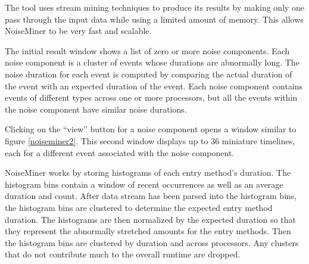 The tool uses stream mining techniques to produce its results by making only one pass through the input data while using a limited amount of memory. This allows NoiseMiner to be very fast and scalable. 


The initial result window shows a list of zero or more noise
components. Each noise component is a cluster of events whose
durations are abnormally long. The noise duration for each event is
computed by comparing the actual duration of the event with an
expected duration of the event. Each noise component contains events
of different types across one or more processors, but all the events
within the noise component have similar noise durations. 

Clicking on the ``view'' button for a noise component opens a window similar to
figure \ref{noiseminer2}. This second window displays up to 36
miniature timelines, each for a different event associated with the
noise component.



NoiseMiner works by storing histograms of each entry method's
duration. The histogram bins contain a window of recent occurrences as
well as an average duration and count. After data stream has been
parsed into the histogram bins, the histogram bins are clustered to
determine the expected entry method duration. The histograms are
then normalized by the expected duration so that they represent the
abnormally stretched amounts for the entry methods. Then the histogram
bins are clustered by duration and across processors. Any clusters
that do not contribute much to the overall runtime are
dropped. 
